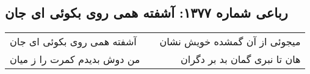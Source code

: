 \begin{center}
\section*{رباعی شماره ۱۳۷۷: آشفته همی روی بکوئی ای جان}
\label{sec:1377}
\begin{longtable}{l p{0.5cm} r}
آشفته همی روی بکوئی ای جان
&&
میجوئی از آن گمشده خویش نشان
\\
من دوش بدیدم کمرت را ز میان
&&
هان تا نبری گمان بد بر دگران
\\
\end{longtable}
\end{center}
